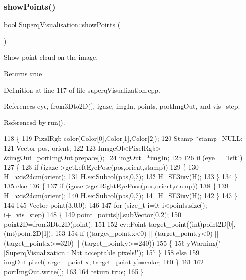 \subsubsection{\texorpdfstring{show\+Points()}{showPoints()}}
{\footnotesize\ttfamily bool Superq\+Visualization\+::show\+Points (\begin{DoxyParamCaption}{ }\end{DoxyParamCaption})}



Show point cloud on the image. 

\begin{DoxyReturn}{Returns}
true 
\end{DoxyReturn}


Definition at line 117 of file superq\+Visualization.\+cpp.



References eye, from3\+Dto2\+D(), igaze, img\+In, points, port\+Img\+Out, and vis\+\_\+step.



Referenced by run().


\begin{DoxyCode}
118 \{
119     PixelRgb color(Color[0],Color[1],Color[2]);
120     Stamp *stamp=NULL;
121     Vector pos, orient;
122 
123     ImageOf<PixelRgb> &imgOut=portImgOut.prepare();
124     imgOut=*imgIn;
125 
126     \textcolor{keywordflow}{if} (eye==\textcolor{stringliteral}{"left"})
127     \{
128         \textcolor{keywordflow}{if} (igaze->getLeftEyePose(pos,orient,stamp))
129         \{
130             H=axis2dcm(orient);
131             H.setSubcol(pos,0,3);
132             H=SE3inv(H);
133         \}
134     \}
135     \textcolor{keywordflow}{else}
136     \{
137         \textcolor{keywordflow}{if} (igaze->getRightEyePose(pos,orient,stamp))
138         \{
139             H=axis2dcm(orient);
140             H.setSubcol(pos,0,3);
141             H=SE3inv(H);
142         \}
143     \}
144 
145     Vector point(3,0.0);
146 
147      \textcolor{keywordflow}{for} (\textcolor{keywordtype}{size\_t} i=0; i<points.size(); i+=vis_step)
148      \{
149          point=points[i].subVector(0,2);
150          point2D=from3Dto2D(point);
151 
152          cv::Point target\_point((\textcolor{keywordtype}{int})point2D[0],(\textcolor{keywordtype}{int})point2D[1]);
153 
154          \textcolor{keywordflow}{if} ((target\_point.x<0) || (target\_point.y<0) || (target\_point.x>=320) || (target\_point.y>=240))
155          \{
156              yWarning(\textcolor{stringliteral}{"[SuperqVisualization]:  Not acceptable pixels!"});
157          \}
158          \textcolor{keywordflow}{else}
159             imgOut.pixel(target\_point.x, target\_point.y)=color;
160      \}
161 
162     portImgOut.write();
163 
164     \textcolor{keywordflow}{return} \textcolor{keyword}{true};
165 \}
\end{DoxyCode}
\mbox{\label{classSuperqVisualization_aa763f8f73c82d4de1d47b03ae9d2e276}} 

